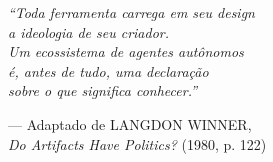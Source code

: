 \thispagestyle{empty}
\begin{flushright}
  \vspace*{6cm}
  \textit{``Toda ferramenta carrega em seu design\\
  a ideologia de seu criador.\\
  Um ecossistema de agentes autônomos\\
  é, antes de tudo, uma declaração\\
  sobre o que significa conhecer.''}

  \vspace{1cm}
  --- Adaptado de LANGDON WINNER,\\
  \textit{Do Artifacts Have Politics?} (1980, p. 122)
\end{flushright}
\newpage
